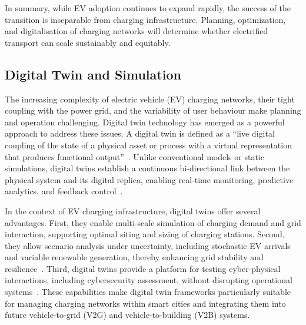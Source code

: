 In summary, while EV adoption continues to expand rapidly, the success of the 
transition is inseparable from charging infrastructure. Planning, optimization, and 
digitalisation of charging networks will determine whether electrified transport 
can scale sustainably and equitably.

\subsection{Digital Twin and Simulation}

The increasing complexity of electric vehicle (EV) charging networks, 
their tight coupling with the power grid, and the variability of user 
behaviour make planning and operation challenging. Digital twin 
technology has emerged as a powerful approach to address these 
issues. A digital twin is defined as a ``live digital coupling of the state 
of a physical asset or process with a virtual representation that 
produces functional output''~\cite{Somers2023}. Unlike conventional 
models or static simulations, digital twins establish a continuous 
bi-directional link between the physical system and its digital replica, 
enabling real-time monitoring, predictive analytics, and feedback 
control~\cite{Liu2021Review,Enders2019}.

In the context of EV charging infrastructure, digital twins offer 
several advantages. First, they enable multi-scale simulation of 
charging demand and grid interaction, supporting optimal siting and 
sizing of charging stations. Second, they allow scenario analysis under 
uncertainty, including stochastic EV arrivals and variable renewable 
generation, thereby enhancing grid stability and resilience~\cite{Talusan2024}. 
Third, digital twins provide a platform for testing cyber-physical 
interactions, including cybersecurity assessment, without disrupting 
operational systems~\cite{Eckhart2019}. These capabilities make digital 
twin frameworks particularly suitable for managing charging networks 
within smart cities and integrating them into future vehicle-to-grid (V2G) 
and vehicle-to-building (V2B) systems.

